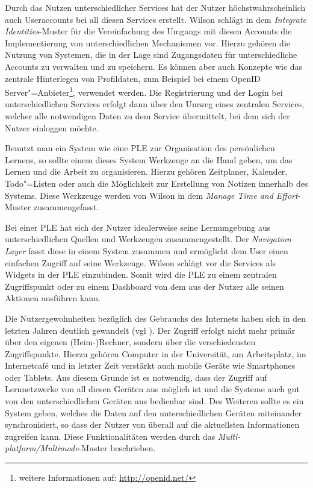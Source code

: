 Durch das Nutzen unterschiedlicher Services hat der Nutzer höchstwahrscheinlich auch Useraccounts bei all diesen Services erstellt. Wilson schlägt in dem \emph{Integrate Identities}-Muster für die Vereinfachung des Umgangs mit diesen Accounts die Implementierung von unterschiedlichen Mechanismen vor. Hierzu gehören die Nutzung von Systemen, die in der Lage sind Zugangsdaten für unterschiedliche Accounts zu verwalten und zu speichern. Es können aber auch Konzepte wie das zentrale Hinterlegen von Profildaten, zum Beispiel bei einem OpenID Server"=Anbieter\footnote{weitere Informationen auf: \url{http://openid.net/}}, verwendet werden. Die Registrierung und der Login bei unterschiedlichen Services erfolgt dann über den Umweg eines zentralen Services, welcher alle notwendigen Daten zu dem Service übermittelt, bei dem sich der Nutzer einloggen möchte.  

Benutzt man ein System wie eine PLE zur Organisation des persönlichen Lernens, so sollte einem dieses System Werkzeuge an die Hand geben, um das Lernen und die Arbeit zu organisieren. Hierzu gehören Zeitplaner, Kalender, Todo"=Listen oder auch die Möglichkeit zur Erstellung von Notizen innerhalb des Systems. Diese Werkzeuge werden von Wilson in dem \emph{Manage Time and Effort}-Muster zusammengefasst.

Bei einer PLE hat sich der Nutzer idealerweise seine Lernumgebung aus unterschiedlichen Quellen und Werkzeugen zusammengestellt. Der \emph{Navigation Layer} fasst diese in einem System zusammen und ermöglicht dem User einen einfachen Zugriff auf seine Werkzeuge. Wilson schlägt vor die Services als Widgets in der PLE einzubinden. Somit wird die PLE zu einem zentralen Zugriffspunkt oder zu einem Dashboard von dem aus der Nutzer alle seinen Aktionen ausführen kann. 

Die Nutzergewohnheiten bezüglich des Gebrauchs des Internets haben sich in den letzten Jahren deutlich gewandelt (vgl \cite{VanHarmelen}). Der Zugriff erfolgt nicht mehr primär über den eigenen (Heim-)Rechner, sondern über die verschiedensten Zugriffspunkte. Hierzu gehören Computer in der Universität, am Arbeitsplatz, im Internetcafé und in letzter Zeit verstärkt auch mobile Geräte wie Smartphones oder Tablets. Aus diesem Grunde ist es notwendig, dass der Zugriff auf Lernnetzwerke von all diesen Geräten aus möglich ist und die Systeme auch gut von den unterschiedlichen Geräten aus bedienbar sind. Des Weiteren sollte es ein System geben, welches die Daten auf den unterschiedlichen Geräten miteinander synchronisiert, so dass der Nutzer von überall auf die aktuellsten Informationen zugreifen kann. Diese Funktionalitäten werden durch das \emph{Multi-platform/Multimode}-Muster beschrieben.

